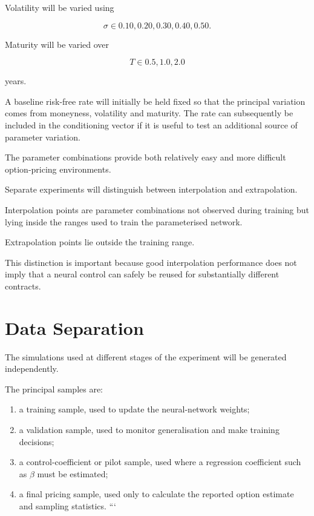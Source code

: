 \documentclass[12pt,a4paper]{report}
\begin{document}
Volatility will be varied using

\begin{equation}
\sigma
\in
{
0.10,
0.20,
0.30,
0.40,
0.50
}.
\end{equation}

Maturity will be varied over

\begin{equation}
T
\in
{
0.5,
1.0,
2.0
}
\end{equation}

years.

A baseline risk-free rate will initially be held fixed so that the principal variation comes from moneyness, volatility and maturity. The rate can subsequently be included in the conditioning vector if it is useful to test an additional source of parameter variation.

The parameter combinations provide both relatively easy and more difficult option-pricing environments.

Separate experiments will distinguish between interpolation and extrapolation.

Interpolation points are parameter combinations not observed during training but lying inside the ranges used to train the parameterised network.

Extrapolation points lie outside the training range.

This distinction is important because good interpolation performance does not imply that a neural control can safely be reused for substantially different contracts.

\section{Data Separation}

The simulations used at different stages of the experiment will be generated independently.

The principal samples are:

\begin{enumerate}[label=\arabic*.]

```
\item a training sample, used to update the neural-network weights;

\item a validation sample, used to monitor generalisation and make training decisions;

\item a control-coefficient or pilot sample, used where a regression coefficient such as \(\beta\) must be estimated;

\item a final pricing sample, used only to calculate the reported option estimate and sampling statistics.
```

\end{enumerate}
\end{document}
